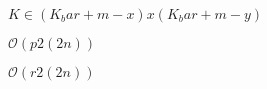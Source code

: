 \documentclass{article}
\begin{document}
$ K \in (K_bar + m -x) x (K_bar +m -y) $
\pagebreak

$ \mathcal{O}(p 2 (2 n)) $
\pagebreak

$ \mathcal{O}(r 2 (2 n)) $
\pagebreak
\end{document}
